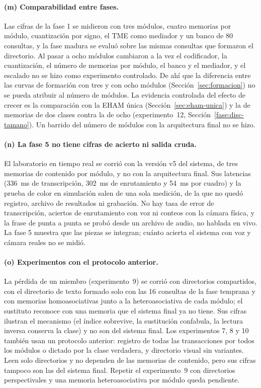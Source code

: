 \paragraph{(m) Comparabilidad entre fases.}
Las cifras de la fase 1 se midieron con tres módulos, cuatro memorias por módulo,
cuantización por signo, el TME como mediador y un banco de 80 consultas, y la fase
madura se evaluó sobre las mismas consultas que formaron el directorio.
Al pasar a ocho módulos cambiaron a la vez el codificador, la cuantización, el número de
memorias por módulo, el banco y el mediador, y el escalado no se hizo como experimento
controlado.
De ahí que la diferencia entre las curvas de formación con tres y con ocho módulos
(Sección~\ref{sec:formacion}) no se pueda atribuir al número de módulos.
La evidencia controlada del efecto de crecer es la comparación con la EHAM única
(Sección~\ref{sec:eham-unica}) y la de memorias de dos clases contra la de ocho
(experimento~12, Sección~\ref{fase:disc-tamano}).
Un barrido del número de módulos con la arquitectura final no se hizo.

\paragraph{(n) La fase 5 no tiene cifras de acierto ni salida cruda.}
El laboratorio en tiempo real se corrió con la versión v5 del sistema, de tres memorias
de contenido por módulo, y no con la arquitectura final.
Sus latencias (336~ms de transcripción, 302~ms de enrutamiento y 54~ms por cuadro) y la
prueba de color en simulación salen de una sola medición, de la que no quedó registro,
archivo de resultados ni grabación.
No hay tasa de error de transcripción, aciertos de enrutamiento con voz ni conteos con
la cámara física, y la frase de punta a punta se probó desde un archivo de audio, no
hablada en vivo.
La fase 5 muestra que las piezas se integran; cuánto acierta el sistema con voz y
cámara reales no se midió.

\paragraph{(o) Experimentos con el protocolo anterior.}
La pérdida de un miembro (experimento~9) se corrió con directorios compartidos, con el
directorio de texto formado solo con las 16 consultas de la fase temprana y con
memorias homoasociativas junto a la heteroasociativa de cada módulo; el sustituto
reconoce con una memoria que el sistema final ya no tiene.
Sus cifras ilustran el mecanismo (el índice sobrevive, la sustitución confabula, la
lectura inversa conserva la clase) y no son del sistema final.
Los experimentos 7, 8 y 10 también usan un protocolo anterior: registro de todas las
transacciones por todos los módulos o dictado por la clase verdadera, y directorio
visual sin variantes.
Leen solo directorios y no dependen de las memorias de contenido, pero sus cifras
tampoco son las del sistema final.
Repetir el experimento~9 con directorios perspectivales y una memoria heteroasociativa
por módulo queda pendiente.
